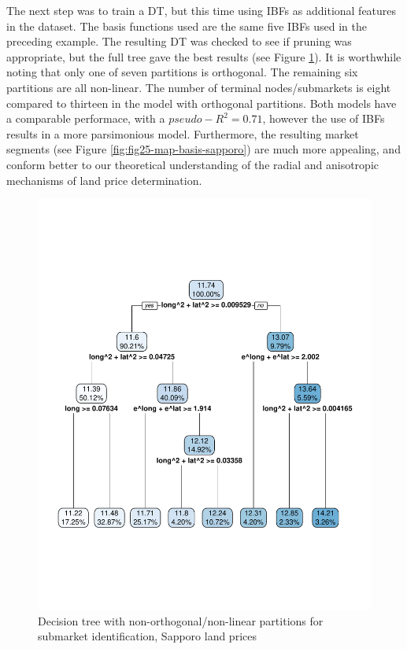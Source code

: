 \documentclass[]{elsarticle} %
\makeatletter
\def\maxwidth{\ifdim\Gin@nat@width>\linewidth\linewidth
\else\Gin@nat@width\fi}
\let\Oldincludegraphics\includegraphics
\renewcommand{\includegraphics}[1]{\Oldincludegraphics[width=\maxwidth]{#1}}
\makeatother
\begin{document}
The next step was to train a DT, but this time using IBFs as additional
features in the dataset. The basis functions used are the same five IBFs
used in the preceding example. The resulting DT was checked to see if
pruning was appropriate, but the full tree gave the best results (see
Figure \ref{fig:fig24-tree-basis-sapporo}). It is worthwhile noting that
only one of seven partitions is orthogonal. The remaining six partitions
are all non-linear. The number of terminal nodes/submarkets is eight
compared to thirteen in the model with orthogonal partitions. Both
models have a comparable performace, with a \(pseudo-R^2=0.71\), however
the use of IBFs results in a more parsimonious model. Furthermore, the
resulting market segments (see Figure \ref{fig:fig25-map-basis-sapporo})
are much more appealing, and conform better to our theoretical
understanding of the radial and anisotropic mechanisms of land price
determination.

\begin{figure}
\centering
\includegraphics{Trees_with_Base_Functions_v3_files/figure-latex/fig24-tree-basis-sapporo-1.pdf}
\caption{\label{fig:fig24-tree-basis-sapporo}Decision tree with
non-orthogonal/non-linear partitions for submarket identification,
Sapporo land prices}
\end{figure}
\end{document}
